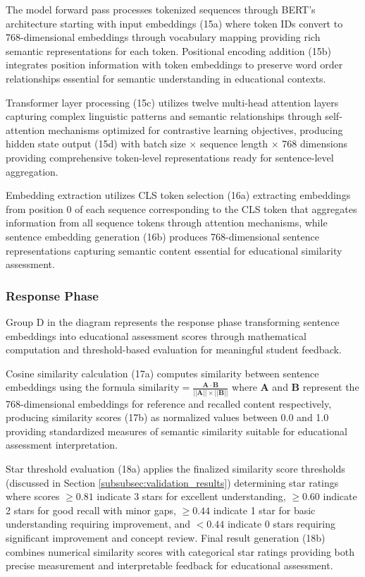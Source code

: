 {The model forward pass processes tokenized sequences through BERT's architecture starting with input embeddings (15a) where token IDs convert to 768-dimensional embeddings through vocabulary mapping providing rich semantic representations for each token. Positional encoding addition (15b) integrates position information with token embeddings to preserve word order relationships essential for semantic understanding in educational contexts.

Transformer layer processing (15c) utilizes twelve multi-head attention layers capturing complex linguistic patterns and semantic relationships through self-attention mechanisms optimized for contrastive learning objectives, producing hidden state output (15d) with batch size $\times$ sequence length $\times$ 768 dimensions providing comprehensive token-level representations ready for sentence-level aggregation.

Embedding extraction utilizes CLS token selection (16a) extracting embeddings from position 0 of each sequence corresponding to the CLS token that aggregates information from all sequence tokens through attention mechanisms, while sentence embedding generation (16b) produces 768-dimensional sentence representations capturing semantic content essential for educational similarity assessment.

\subsubsection{Response Phase}

Group D in the diagram represents the response phase transforming sentence embeddings into educational assessment scores through mathematical computation and threshold-based evaluation for meaningful student feedback.

Cosine similarity calculation (17a) computes similarity between sentence embeddings using the formula $\text{similarity} = \frac{\mathbf{A} \cdot \mathbf{B}}{||\mathbf{A}|| \times ||\mathbf{B}||}$ where $\mathbf{A}$ and $\mathbf{B}$ represent the 768-dimensional embeddings for reference and recalled content respectively, producing similarity scores (17b) as normalized values between 0.0 and 1.0 providing standardized measures of semantic similarity suitable for educational assessment interpretation.

Star threshold evaluation (18a) applies the finalized similarity score thresholds (discussed in Section \ref{subsubsec:validation_results}) determining star ratings where scores $\geq 0.81$ indicate 3 stars for excellent understanding, $\geq 0.60$ indicate 2 stars for good recall with minor gaps, $\geq 0.44$ indicate 1 star for basic understanding requiring improvement, and $< 0.44$ indicate 0 stars requiring significant improvement and concept review. Final result generation (18b) combines numerical similarity scores with categorical star ratings providing both precise measurement and interpretable feedback for educational assessment.

}
